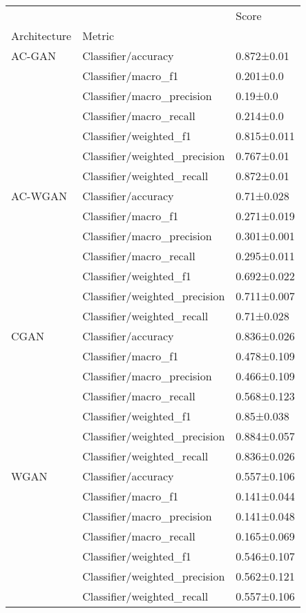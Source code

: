 \begin{tabular}{lll}
\toprule
     &                            &        Score \\
Architecture & Metric &              \\
\midrule
AC-GAN & Classifier/accuracy &   0.872±0.01 \\
     & Classifier/macro\_f1 &    0.201±0.0 \\
     & Classifier/macro\_precision &     0.19±0.0 \\
     & Classifier/macro\_recall &    0.214±0.0 \\
     & Classifier/weighted\_f1 &  0.815±0.011 \\
     & Classifier/weighted\_precision &   0.767±0.01 \\
     & Classifier/weighted\_recall &   0.872±0.01 \\
AC-WGAN & Classifier/accuracy &   0.71±0.028 \\
     & Classifier/macro\_f1 &  0.271±0.019 \\
     & Classifier/macro\_precision &  0.301±0.001 \\
     & Classifier/macro\_recall &  0.295±0.011 \\
     & Classifier/weighted\_f1 &  0.692±0.022 \\
     & Classifier/weighted\_precision &  0.711±0.007 \\
     & Classifier/weighted\_recall &   0.71±0.028 \\
CGAN & Classifier/accuracy &  0.836±0.026 \\
     & Classifier/macro\_f1 &  0.478±0.109 \\
     & Classifier/macro\_precision &  0.466±0.109 \\
     & Classifier/macro\_recall &  0.568±0.123 \\
     & Classifier/weighted\_f1 &   0.85±0.038 \\
     & Classifier/weighted\_precision &  0.884±0.057 \\
     & Classifier/weighted\_recall &  0.836±0.026 \\
WGAN & Classifier/accuracy &  0.557±0.106 \\
     & Classifier/macro\_f1 &  0.141±0.044 \\
     & Classifier/macro\_precision &  0.141±0.048 \\
     & Classifier/macro\_recall &  0.165±0.069 \\
     & Classifier/weighted\_f1 &  0.546±0.107 \\
     & Classifier/weighted\_precision &  0.562±0.121 \\
     & Classifier/weighted\_recall &  0.557±0.106 \\
\bottomrule
\end{tabular}
